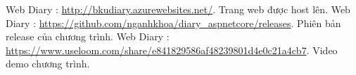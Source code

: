 \documentclass[a4paper]{article}
\begin{document}
\begin{thebibliography}{99999}
 {Web Diary : \url{http://bkudiary.azurewebsites.net/}}. Trang web được host lên.
 {Web Diary : \url{https://github.com/nganhkhoa/diary_aspnetcore/releases}}. Phiên bản release của chương trình.
 {Web Diary : \url{https://www.useloom.com/share/e841829586af48239801d4e0c21a4cb7}}. Video demo chương trình.



\end{thebibliography}
\end{document}
